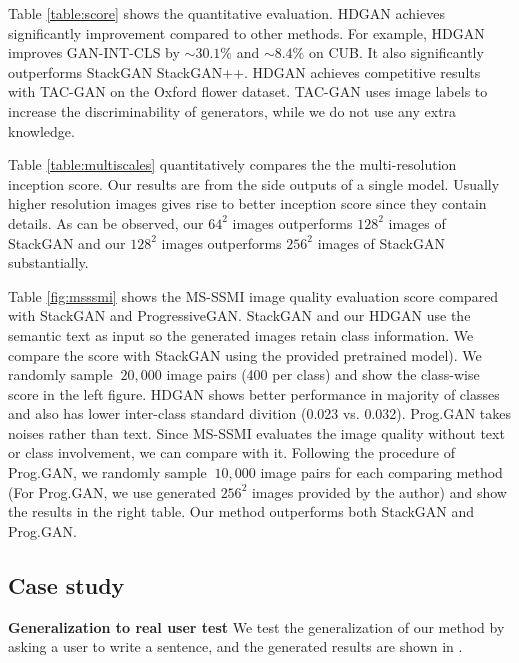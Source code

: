 \documentclass[10pt,twocolumn,letterpaper]{article}
\begin{document}


Table \ref{table:score} shows the quantitative evaluation. HDGAN achieves significantly improvement compared to other methods. For example, HDGAN improves GAN-INT-CLS by ${\sim}30.1\%$  and ${\sim}8.4\%$ on CUB. It also significantly outperforms StackGAN StackGAN++.
HDGAN achieves competitive results with TAC-GAN on the Oxford flower dataset. TAC-GAN uses image labels to increase the discriminability of generators, while we do not use any extra knowledge.


Table \ref{table:multiscales} quantitatively compares the the multi-resolution inception score. Our results are from the side outputs of a single model. Usually higher resolution images gives rise to better inception score since they contain details. As can be observed, our $64^2$ images outperforms $128^2$ images of StackGAN and our $128^2$ images outperforms $256^2$ images of StackGAN substantially. 

Table \ref{fig:msssmi} shows the MS-SSMI image quality evaluation score compared with StackGAN and ProgressiveGAN. StackGAN and our HDGAN use the semantic text as input so the generated images retain class information. We compare the score with StackGAN using the provided pretrained model). We randomly sample ${~}20,000$ image pairs (400 per class) and show the class-wise score in the left figure. HDGAN shows better performance in majority of classes and also has lower inter-class standard divition (0.023 vs. 0.032).
Prog.GAN takes noises rather than text. Since MS-SSMI evaluates the image quality without text or class involvement, we can compare with it. Following the procedure of Prog.GAN, we randomly sample ${~}10,000$ image pairs for each comparing method (For Prog.GAN, we use generated $256^2$ images provided by the author) and show the results in the right table. Our method outperforms both StackGAN and Prog.GAN. 


\subsection{Case study}
\textbf{Generalization to real user test}
We test the generalization of our method by asking a user to write a sentence, and the generated results are shown in .
\end{document}
